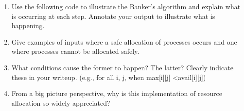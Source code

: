 \documentclass[11pt]{article}
\begin{document}
\begin{enumerate}

\item Use the following code to illustrate the Banker’s algorithm and explain what is occurring at each step. Annotate your output to illustrate what is happening.

\end{enumerate}

\begin{center}

\end{center}

\begin{enumerate}
\setcounter{enumi}{1}

\item Give examples of inputs where a safe allocation of processes occurs and one where processes cannot be allocated safely.

\item What conditions cause the former to happen? The latter? Clearly indicate these in your writeup. (e.g., for all i, j, when max[i][j] \textless avail[i][j])

\item From a big picture perspective, why is this implementation of resource allocation so widely appreciated?

\end{enumerate}
\end{document}
